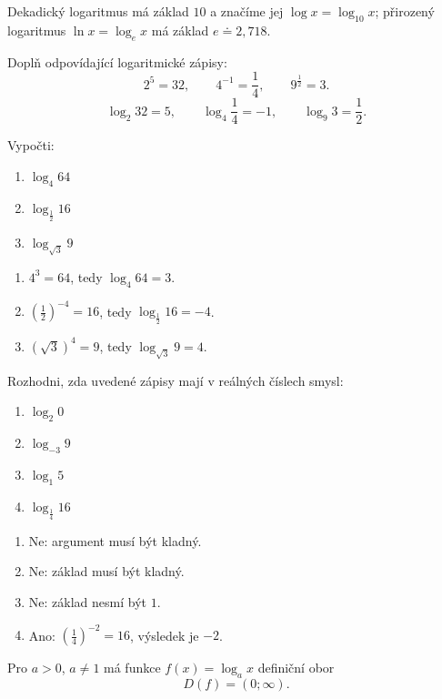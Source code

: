 \documentclass[11pt,a4paper]{article}
\begin{document}
Dekadický logaritmus má základ $10$ a značíme jej $\log x=\log_{10}x$; přirozený logaritmus $\ln x=\log_e x$ má základ $e\doteq2{,}718$.
\begin{prikladReseniBox}[title={Příklad 1}]
Doplň odpovídající logaritmické zápisy:
\[
2^5=32,\qquad 4^{-1}=\frac14,\qquad 9^{\frac12}=3.
\]
\tcblower
\[
\log_2 32=5,\qquad \log_4\frac14=-1,\qquad \log_9 3=\frac12.
\]
\end{prikladReseniBox}
\begin{prikladReseniBox}[title={Příklad 2}]
Vypočti:
\begin{enumerate}[label=\alph*)]
\item $\log_4 64$
\item $\log_{\frac12} 16$
\item $\log_{\sqrt{3}} 9$
\end{enumerate}
\tcblower
\begin{enumerate}[label=\alph*)]
\item $4^3=64$, tedy $\log_4 64=3$.
\item $\left(\frac12\right)^{-4}=16$, tedy $\log_{\frac12}16=-4$.
\item $(\sqrt3)^4=9$, tedy $\log_{\sqrt3}9=4$.
\end{enumerate}
\end{prikladReseniBox}
\begin{prikladReseniBox}[title={Příklad 3}]
Rozhodni, zda uvedené zápisy mají v reálných číslech smysl:
\begin{enumerate}[label=\alph*)]
\item $\log_2 0$
\item $\log_{-3} 9$
\item $\log_1 5$
\item $\log_{\frac14} 16$
\end{enumerate}
\tcblower
\begin{enumerate}[label=\alph*)]
\item Ne: argument musí být kladný.
\item Ne: základ musí být kladný.
\item Ne: základ nesmí být $1$.
\item Ano: $\left(\frac14\right)^{-2}=16$, výsledek je $-2$.
\end{enumerate}
\end{prikladReseniBox}
\begin{definiceBox}[title={Definice -- definiční obor logaritmické funkce}]
Pro $a>0$, $a\ne1$ má funkce $f(x)=\log_a x$ definiční obor
\[
D(f)=(0;\infty).
\]
\end{definiceBox}
\end{document}
